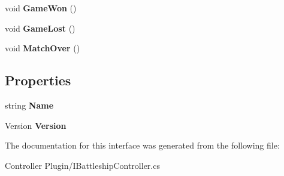 \begin{DoxyCompactItemize}
\item 
\hypertarget{interface_m_b_c_1_1_core_1_1_i_battleship_controller_add0a1ee69c8b1ee623635a6886263841}{void {\bfseries Game\-Won} ()}\label{interface_m_b_c_1_1_core_1_1_i_battleship_controller_add0a1ee69c8b1ee623635a6886263841}

\item 
\hypertarget{interface_m_b_c_1_1_core_1_1_i_battleship_controller_a0d0534e190e468cdfb1d7a333dc025d7}{void {\bfseries Game\-Lost} ()}\label{interface_m_b_c_1_1_core_1_1_i_battleship_controller_a0d0534e190e468cdfb1d7a333dc025d7}

\item 
\hypertarget{interface_m_b_c_1_1_core_1_1_i_battleship_controller_a35963db7e91bf53b2f9152898659e098}{void {\bfseries Match\-Over} ()}\label{interface_m_b_c_1_1_core_1_1_i_battleship_controller_a35963db7e91bf53b2f9152898659e098}

\end{DoxyCompactItemize}
\subsection*{Properties}
\begin{DoxyCompactItemize}
\item 
\hypertarget{interface_m_b_c_1_1_core_1_1_i_battleship_controller_a6a6130592110828d325bc93e1d55586d}{string {\bfseries Name}}\label{interface_m_b_c_1_1_core_1_1_i_battleship_controller_a6a6130592110828d325bc93e1d55586d}

\item 
\hypertarget{interface_m_b_c_1_1_core_1_1_i_battleship_controller_a526e01cd2a35e521f0965b3fbb1b4cd4}{Version {\bfseries Version}}\label{interface_m_b_c_1_1_core_1_1_i_battleship_controller_a526e01cd2a35e521f0965b3fbb1b4cd4}

\end{DoxyCompactItemize}


The documentation for this interface was generated from the following file\-:\begin{DoxyCompactItemize}
\item 
Controller Plugin/I\-Battleship\-Controller.\-cs\end{DoxyCompactItemize}
